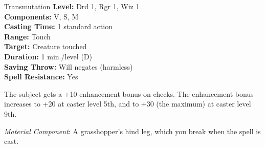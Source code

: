 {Transmutation}
{
	\textbf{Level:}
	Drd 1, Rgr 1, Wiz 1\\
	\textbf{Components:}
	V, S, M\\
	\textbf{Casting Time:}
	1 standard action\\
	\textbf{Range:}
	Touch\\
	\textbf{Target:}
	Creature touched\\
	\textbf{Duration:}
	1 min./level (D)\\
	\textbf{Saving Throw:}
	Will negates (harmless)\\
	\textbf{Spell Resistance:}
	Yes\\
}
{
	The subject gets a +10 enhancement bonus on  checks. The enhancement bonus increases to +20 at caster level 5th, and to +30 (the maximum) at caster level 9th.

	\textit{Material Component}:
	A grasshopper's hind leg, which you break when the spell is cast.

}
